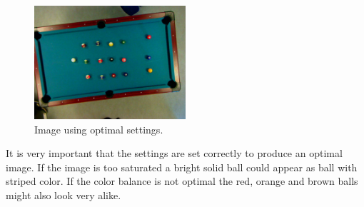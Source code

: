 \begin{figure}[htpb]
\begin{center}
\leavevmode
\includegraphics[width=0.5\textwidth]{images/good-from-program}
\end{center}
\caption{Image using optimal settings.}
\label{fig:bestimgcamera}
\end{figure} 

It is very important that the settings are set correctly to produce an optimal image. If the image is too saturated a bright solid ball could appear as ball with striped color. If the color balance is not optimal the red, orange and brown balls might also look very alike.